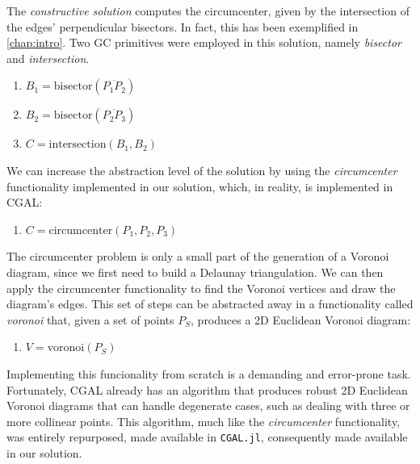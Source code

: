 The \textit{constructive solution} computes the circumcenter, given by the
intersection of the edges' perpendicular bisectors.  In fact, this has been
exemplified in \cref{chap:intro}.  Two \ac{GC} primitives were employed in this
solution, namely \textit{bisector} and \textit{intersection}.

\begin{enumerate}
  \item $B_1 = \mathrm{bisector}\left(\overline{P_1 P_2}\right)$
  \item $B_2 = \mathrm{bisector}\left(\overline{P_2 P_3}\right)$
  \item $C = \mathrm{intersection}\left(B_1, B_2\right)$
\end{enumerate}

We can increase the abstraction level of the solution by using the
\textit{circumcenter} functionality implemented in our solution, which, in
reality, is implemented in \ac{CGAL}:

\begin{enumerate}
  \item $C = \mathrm{circumcenter}\left(P_1, P_2, P_3\right)$
\end{enumerate}

The circumcenter problem is only a small part of the generation of a Voronoi
diagram, since we first need to build a Delaunay triangulation.  We can then 
apply the $\mathrm{circumcenter}$ functionality to find the Voronoi vertices and
draw the diagram's edges.  This set of steps can be abstracted away in a
functionality called \textit{voronoi} that, given a set of points $P_S$,
produces a 2D Euclidean Voronoi diagram:

\begin{enumerate}
  \item $V = \mathrm{voronoi}\left(P_S\right)$
\end{enumerate}

Implementing this funcionality from scratch is a demanding and error-prone task.
Fortunately, \ac{CGAL} already has an algorithm that produces robust 2D
Euclidean Voronoi diagrams that can handle degenerate cases, such as dealing
with three or more collinear points.  This algorithm, much like the
\textit{circumcenter} functionality, was entirely repurposed, made available in
\texttt{CGAL.jl}, consequently made available in our solution.
